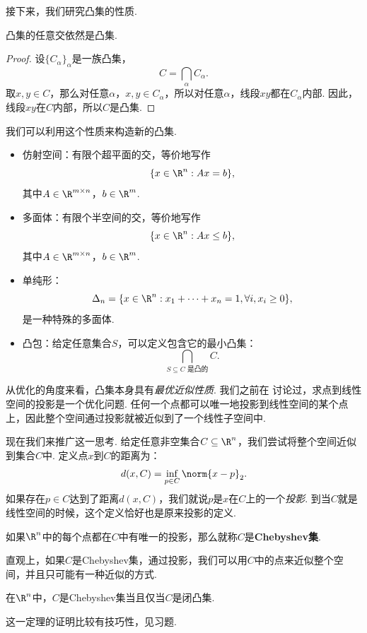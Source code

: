 接下来，我们研究凸集的性质.

\begin{proposition}\label{prop:convex-set-intersect}
    凸集的任意交依然是凸集.
\end{proposition}
\begin{proof}
    设$\{C_\alpha\}_\alpha$是一族凸集，
    \[C=\bigcap_\alpha C_\alpha.\]
    取$x,y\in C$，那么对任意$\alpha$，$x,y\in C_\alpha$，所以对任意$\alpha$，线段$xy$都在$C_\alpha$内部. 因此，线段$xy$在$C$内部，所以$C$是凸集.
\end{proof}

我们可以利用这个性质来构造新的凸集.
\begin{example}
\begin{itemize}
    \item 仿射空间：有限个超平面的交，等价地写作
    \[\{x\in\R^n:Ax=b\},\]
    其中$A\in\R^{m\times n}$，$b\in\R^m$.
    \item 多面体：有限个半空间的交，等价地写作
    \[\{x\in\R^n:Ax\leq b\},\]
    其中$A\in\R^{m\times n}$，$b\in\R^m$.
    \item 单纯形：
    \[\Delta_n=\{x\in\R^n:x_1+\dots+x_n=1,\forall i,x_i\geq 0\},\]
    是一种特殊的多面体.
    \item 凸包：给定任意集合$S$，可以定义包含它的最小凸集：
    \[\bigcap_{S\subseteq C\text{ 是凸的}} C.\]
\end{itemize}
\end{example}

从优化的角度来看，凸集本身具有\emph{最优近似性质}. 我们之前在 讨论过，求点到线性空间的投影是一个优化问题. 任何一个点都可以唯一地投影到线性空间的某个点上，因此整个空间通过投影就被近似到了一个线性子空间中. 

现在我们来推广这一思考. 给定任意非空集合$C\subseteq\R^n$，我们尝试将整个空间近似到集合$C$中. 定义点$x$到$C$的距离为：
\[d(x,C)=\inf_{p\in C}\norm{x-p}_2.\]
如果存在$p\in C$达到了距离$d(x,C)$，我们就说$p$是$x$在$C$上的一个\emph{投影}. 到当$C$就是线性空间的时候，这个定义恰好也是原来投影的定义.

如果$\R^n$中的每个点都在$C$中有唯一的投影，那么就称$C$是\textbf{Chebyshev集}. 

直观上，如果$C$是Chebyshev集，通过投影，我们可以用$C$中的点来近似整个空间，并且只可能有一种近似的方式. 

\begin{theorem}
    在$\R^n$中，$C$是Chebyshev集当且仅当$C$是闭凸集.
\end{theorem}
这一定理的证明比较有技巧性，见习题.

